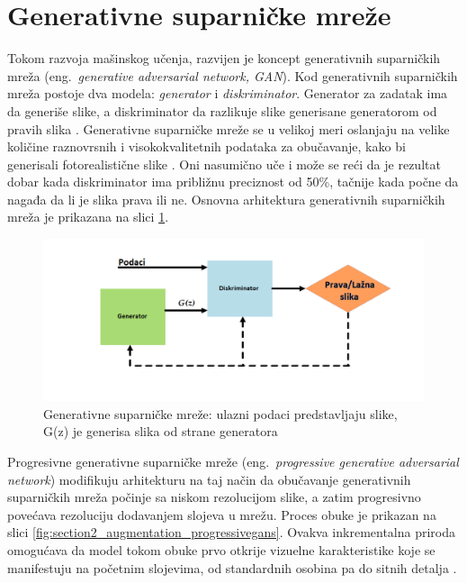 \documentclass[12pt,oneside]{memoir}
\begin{document}
\section{Generativne suparničke mreže}
\label{section3_increasedata_gan}
Tokom razvoja mašinskog učenja, razvijen je koncept generativnih suparničkih mreža (eng.~\textit{generative adversarial network, GAN}). Kod generativnih suparničkih mreža postoje dva modela: \textit{generator} i \textit{diskriminator}. Generator za zadatak ima da generiše slike, a diskriminator da razlikuje slike generisane generatorom od pravih slika \cite{goodfellow2014generative}. Generativne suparničke mreže se u velikoj meri oslanjaju na velike količine raznovrsnih i visokokvalitetnih podataka za obučavanje, kako bi generisali fotorealistične slike \cite{zhao2020differentiable}. Oni nasumično uče i može se reći da je rezultat dobar kada diskriminator ima približnu preciznost od 50\%, tačnije kada počne da nagađa da li je slika prava ili ne. Osnovna arhitektura generativnih suparničkih mreža je prikazana na slici \ref{fig:section2_gans}. 

\begin{figure}[ht]
    \centering
    \includegraphics[width=1\textwidth]{matfmaster/glava2/gans_cus.png}
    \caption{Generativne suparničke mreže: ulazni podaci predstavljaju slike, G(z) je generisa slika od strane generatora \cite{gans_image}}
    \label{fig:section2_gans}
\end{figure}

Progresivne generativne suparničke mreže (eng.~\textit{progressive generative adversarial network}) modifikuju arhitekturu na taj način da obučavanje generativnih suparničkih mreža počinje sa niskom rezolucijom slike, a zatim progresivno povećava rezoluciju dodavanjem slojeva u mrežu. Proces obuke je prikazan na slici \ref{fig:section2_augmentation_progressivegans}. Ovakva inkrementalna priroda omogućava da model tokom obuke prvo otkrije vizuelne karakteristike koje se manifestuju na početnim slojevima, od standardnih osobina pa do sitnih detalja \cite{karras2017progressive}.
\end{document}
